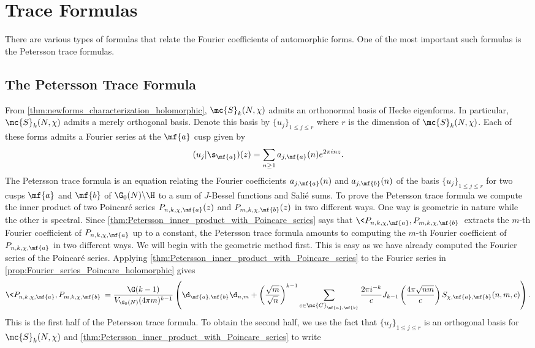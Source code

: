 \chapter{Trace Formulas}
  There are various types of formulas that relate the Fourier coefficients of automorphic forms. One of the most important such formulas is the Petersson trace formulas.
  \section{The Petersson Trace Formula}
    From \cref{thm:newforms_characterization_holomorphic}, $\mc{S}_{k}(N,\chi)$ admits an orthonormal basis of Hecke eigenforms. In particular, $\mc{S}_{k}(N,\chi)$ admits a merely orthogonal basis. Denote this basis by $\{u_{j}\}_{1 \le j \le r}$ where $r$ is the dimension of $\mc{S}_{k}(N,\chi)$. Each of these forms admits a Fourier series at the $\mf{a}$ cusp given by
    \[
      (u_{j}|\s_{\mf{a}})(z) = \sum_{n \ge 1}a_{j,\mf{a}}(n)e^{2\pi inz}.
    \]
    The Petersson trace formula is an equation relating the Fourier coefficients $a_{j,\mf{a}}(n)$ and $a_{j,\mf{b}}(n)$ of the basis $\{u_{j}\}_{1 \le j \le r}$ for two cusps $\mf{a}$ and $\mf{b}$ of $\G_{0}(N)\backslash\H$ to a sum of $J$-Bessel functions and Sali\'e sums. To prove the Petersson trace formula we compute the inner product of two Poincar\'e series $P_{n,k,\chi,\mf{a}}(z)$ and $P_{m,k,\chi,\mf{b}}(z)$ in two different ways. One way is geometric in nature while the other is spectral. Since \cref{thm:Petersson_inner_product_with_Poincare_series} says that $\<P_{n,k,\chi,\mf{a}},P_{m,k,\chi,\mf{b}}\>$ extracts the $m$-th Fourier coefficient of $P_{n,k,\chi,\mf{a}}$ up to a constant, the Petersson trace formula amounts to computing the $m$-th Fourier coefficient of $P_{n,k,\chi,\mf{a}}$ in two different ways. We will begin with the geometric method first. This is easy as we have already computed the Fourier series of the Poincar\'e series. Applying \cref{thm:Petersson_inner_product_with_Poincare_series} to the Fourier series in \cref{prop:Fourier_series_Poincare_holomorphic} gives
    \[
      \<P_{n,k,\chi,\mf{a}},P_{m,k,\chi,\mf{b}}\> = \frac{\G(k-1)}{V_{\G_{0}(N)}(4\pi m)^{k-1}}\left(\d_{\mf{a},\mf{b}}\d_{n,m}+\left(\frac{\sqrt{m}}{\sqrt{n}}\right)^{k-1}\sum_{c \in \mc{C}_{\mf{a},\mf{b}}}\frac{2\pi i^{-k}}{c}J_{k-1}\left(\frac{4\pi\sqrt{nm}}{c}\right)S_{\chi,\mf{a},\mf{b}}(n,m,c)\right).
    \]
    This is the first half of the Petersson trace formula. To obtain the second half, we use the fact that $\{u_{j}\}_{1 \le j \le r}$ is an orthogonal basis for $\mc{S}_{k}(N,\chi)$ and \cref{thm:Petersson_inner_product_with_Poincare_series} to write
